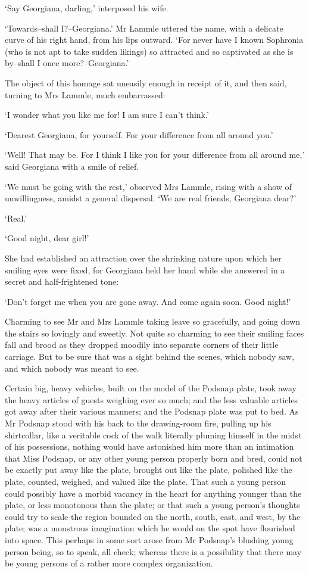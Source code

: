 ‘Say Georgiana, darling,’ interposed his wife.

‘Towards--shall I?--Georgiana.’ Mr Lammle uttered the name, with a
delicate curve of his right hand, from his lips outward. ‘For never have
I known Sophronia (who is not apt to take sudden likings) so attracted
and so captivated as she is by--shall I once more?--Georgiana.’

The object of this homage sat uneasily enough in receipt of it, and then
said, turning to Mrs Lammle, much embarrassed:

‘I wonder what you like me for! I am sure I can’t think.’

‘Dearest Georgiana, for yourself. For your difference from all around
you.’

‘Well! That may be. For I think I like you for your difference from all
around me,’ said Georgiana with a smile of relief.

‘We must be going with the rest,’ observed Mrs Lammle, rising with a
show of unwillingness, amidst a general dispersal. ‘We are real friends,
Georgiana dear?’

‘Real.’

‘Good night, dear girl!’

She had established an attraction over the shrinking nature upon which
her smiling eyes were fixed, for Georgiana held her hand while she
answered in a secret and half-frightened tone:

‘Don’t forget me when you are gone away. And come again soon. Good
night!’

Charming to see Mr and Mrs Lammle taking leave so gracefully, and going
down the stairs so lovingly and sweetly. Not quite so charming to see
their smiling faces fall and brood as they dropped moodily into separate
corners of their little carriage. But to be sure that was a sight behind
the scenes, which nobody saw, and which nobody was meant to see.

Certain big, heavy vehicles, built on the model of the Podsnap plate,
took away the heavy articles of guests weighing ever so much; and the
less valuable articles got away after their various manners; and the
Podsnap plate was put to bed. As Mr Podsnap stood with his back to the
drawing-room fire, pulling up his shirtcollar, like a veritable cock
of the walk literally pluming himself in the midst of his possessions,
nothing would have astonished him more than an intimation that Miss
Podsnap, or any other young person properly born and bred, could not be
exactly put away like the plate, brought out like the plate, polished
like the plate, counted, weighed, and valued like the plate. That such
a young person could possibly have a morbid vacancy in the heart for
anything younger than the plate, or less monotonous than the plate;
or that such a young person’s thoughts could try to scale the region
bounded on the north, south, east, and west, by the plate; was a
monstrous imagination which he would on the spot have flourished into
space. This perhaps in some sort arose from Mr Podsnap’s blushing young
person being, so to speak, all cheek; whereas there is a possibility
that there may be young persons of a rather more complex organization.

